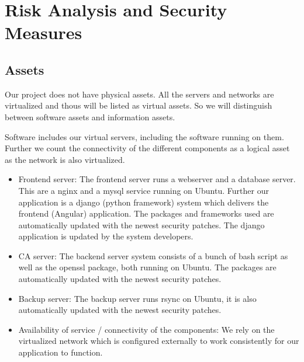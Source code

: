 \documentclass[english]{article}
\begin{document}
%


\section{Risk Analysis and Security Measures}

\subsection{Assets}


Our project does not have physical assets. All the servers and networks are virtualized and thous will be listed as virtual assets. So we will distinguish between software assets and information assets.

Software includes our virtual servers, including the software running on them. Further we count the connectivity of the different components as a logical asset as the network is also virtualized.

\begin{itemize}
	\item Frontend server: The frontend server runs a webserver and a database server. This are a nginx and a mysql service running on Ubuntu. Further our application is a django (python framework)  system which delivers the frontend (Angular) application. The packages and frameworks used are automatically updated with the newest security patches. The django application is updated by the system developers.
	\item CA server: The backend server system consists of a bunch of bash script as well as the openssl package, both running on Ubuntu. The packages are automatically updated with the newest security patches.
	\item Backup server: The backup server runs rsync on Ubuntu, it is also automatically updated with the newest security patches.
	\item Availability of service / connectivity of the components: We rely on the virtualized network which is configured externally to work consistently  for our application to function.
\end{itemize}
\end{document}
